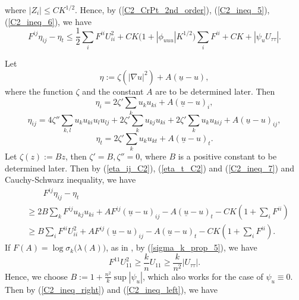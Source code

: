 \documentclass[12pt]{amsart}
\theoremstyle{definition}
\theoremstyle{remark}
\numberwithin{equation}{section}
\begin{document}
where $|Z_i| \leq CK^{1/2}$.
Hence, by (\ref{C2_CrPt_2nd_order}), (\ref{C2_ineq_5}), (\ref{C2_ineq_6}), we have
\begin{equation}\label{C2_ineq_right}
F^{ij} \eta_{ij} - \eta_t \leq \frac{1}{2} \sum_i F^{ii} U_{ii}^2 + C K \Big(1 + |\phi_{uuu}| K^{1/2}\Big) \sum_i F^{ii} + CK + |\psi_u U_{\tau\tau}|.
\end{equation}

Let 
\begin{equation}\label{eta_C2}
\eta := \zeta (|\nabla u|^2) + A (\underline{u} - u),
\end{equation}
where the function $\zeta$ and the constant $A$ are to be determined later. Then
\begin{equation}
\eta_i = 2 \zeta' \sum_k u_k u_{ki} + A (\underline{u} - u)_i,
\end{equation}
\begin{equation}\label{eta_ij_C2}
\eta_{ij} = 4 \zeta'' \sum_{k, l} u_k u_{ki} u_l u_{lj} + 2 \zeta' \sum_k u_{kj} u_{ki} + 2\zeta' \sum_k u_k u_{kij}  + A (\underline{u} - u)_{ij},
\end{equation}
\begin{equation}\label{eta_t_C2}
\eta_t = 2\zeta' \sum_k u_k u_{kt} + A (\underline{u} - u)_t.
\end{equation}
Let $\zeta (z) := Bz$, then $\zeta' = B,\zeta'' =0$, where $B$ is a positive constant to be determined later. Then by (\ref{eta_ij_C2}), (\ref{eta_t_C2})  and (\ref{C2_ineq_7}) and Cauchy-Schwarz inequality, we have
\begin{equation}\label{C2_ineq_left}
\begin{aligned}
& \qquad F^{ij} \eta _{ij} - \eta_t\\
&\geq 2 B \sum_k F^{ij} u_{kj} u_{ki} + A F^{ij} (\underline{u} -u)_{ij} - A(\underline{u} - u)_t - CK(1 + \sum_i F^{ii}) \\
& \geq B \sum_i F^{ii} U_{ii}^2 + A F^{ij} (\underline{u} -u)_{ij} - A(\underline{u} - u)_t - CK(1 + \sum_i F^{ii}).
\end{aligned}
\end{equation}
If $F(A) = \log \sigma_k \big(\lambda(A)\big)$, as in \cite{MaQiu19}, by (\ref{sigma_k_prop_5}), we have
\begin{equation}
F^{11}U_{11}^2 \geq \frac{k}{n} U_{11} \geq \frac{k}{n^2} |U_{\tau\tau}|.
\end{equation}
Hence, we choose $B := 1 + \frac{n^2}{k} \sup |\psi_u|$, which also works for the case of $\psi_u \equiv 0$.
Then by (\ref{C2_ineq_right}) and (\ref{C2_ineq_left}), we have
\end{document}
